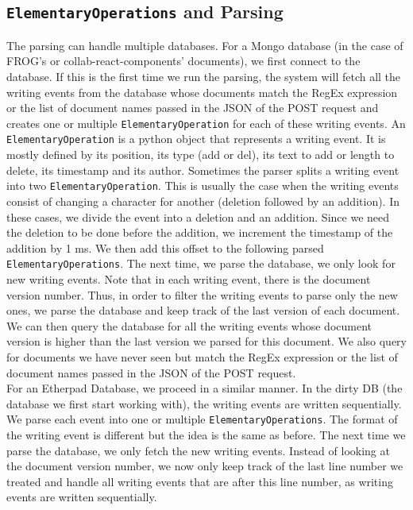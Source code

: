 \documentclass[a4, twocolumn, 12pt]{article}
\begin{document}
\subsection{\texttt{ElementaryOperations} and Parsing}
The parsing can handle multiple databases. For a Mongo database (in the case of FROG’s or collab-react-components’ documents), we first connect to the database. If this is the first time we run the parsing, the system will fetch all the writing events from the database whose documents match the RegEx expression or the list of document names passed in the JSON of the POST request and creates one or multiple \texttt{ElementaryOperation} for each of these writing events. An \texttt{ElementaryOperation} is a python object that represents a writing event. It is mostly defined by its position, its type (add or del), its text to add or length to delete, its timestamp and its author. Sometimes the parser splits a writing event into two \texttt{ElementaryOperation}. This is usually the case when the writing events consist of changing a character for another (deletion followed by an addition). In these cases, we divide the event into a deletion and an addition. Since we need the deletion to be done before the addition, we increment the timestamp of the addition by 1 ms. We then add this offset to the following parsed \texttt{ElementaryOperations}. The next time, we parse the database, we only look for new writing events. Note that in each writing event, there is the document version number. Thus, in order to filter the writing events to parse only the new ones, we parse the database and keep track of the last version of each document. We can then query the database for all the writing events whose document version is higher than the last version we parsed for this document. We also query for documents we have never seen but match the RegEx expression or the list of document names passed in the JSON of the POST request. \\
For an Etherpad Database, we proceed in a similar manner. In the dirty DB (the database we first start working with), the writing events are written sequentially. We parse each event into one or multiple \texttt{ElementaryOperations}. The format of the writing event is different but the idea is the same as before. The next time we parse the database, we only fetch the new writing events. Instead of looking at the document version number, we now only keep track of the last line number we treated and handle all writing events that are after this line number, as writing events are written sequentially.\\
\end{document}
